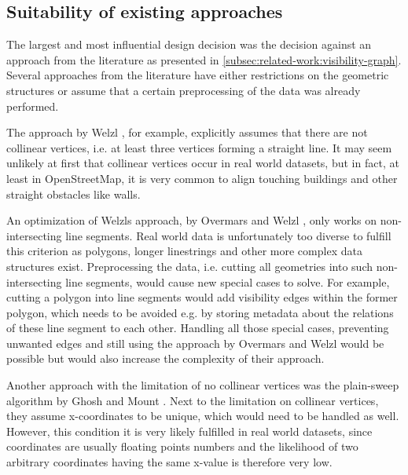 	\subsection{Suitability of existing approaches}

		The largest and most influential design decision was the decision against an approach from the literature as presented in \cref{subsec:related-work:visibility-graph}.
		Several approaches from the literature have either restrictions on the geometric structures or assume that a certain preprocessing of the data was already performed.
		
		The approach by Welzl \cite{welzl-visibility-graph}, for example, explicitly assumes that there are not collinear vertices, i.e. at least three vertices forming a straight line.
		It may seem unlikely at first that collinear vertices occur in real world datasets, but in fact, at least in OpenStreetMap, it is very common to align touching buildings and other straight obstacles like walls.
		
		An optimization of Welzls approach, by Overmars and Welzl \cite{overmars-weizl-visibility-graph}, only works on non-intersecting line segments.
		Real world data is unfortunately too diverse to fulfill this criterion as polygons, longer linestrings and other more complex data structures exist.
		Preprocessing the data, i.e. cutting all geometries into such non-intersecting line segments, would cause new special cases to solve.
		For example, cutting a polygon into line segments would add visibility edges within the former polygon, which needs to be avoided e.g. by storing metadata about the relations of these line segment to each other.
		Handling all those special cases, preventing unwanted edges and still using the approach by Overmars and Welzl would be possible but would also increase the complexity of their approach.
		
		Another approach with the limitation of no collinear vertices was the plain-sweep algorithm by Ghosh and Mount \cite{ghosh-output-sensitive-vgraph}.
		Next to the limitation on collinear vertices, they assume x-coordinates to be unique, which would need to be handled as well.
		However, this condition it is very likely fulfilled in real world datasets, since coordinates are usually floating points numbers and the likelihood of two arbitrary coordinates having the same x-value is therefore very low.
		
